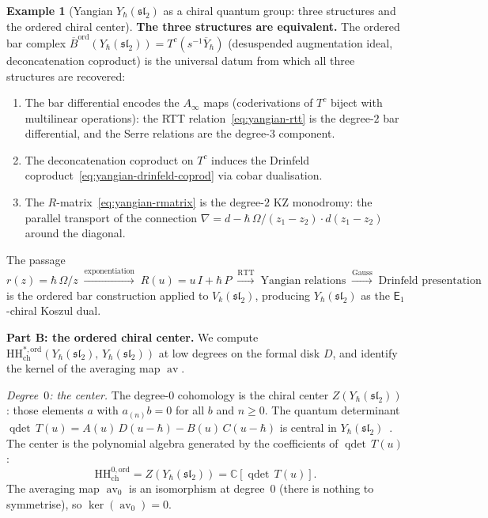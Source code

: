 \documentclass[11pt,reqno]{amsart}
\theoremstyle{definition}
\newtheorem{example}[theorem]{Example}
\theoremstyle{remark}
\newcommand{\HH}{\mathrm{HH}}
\newcommand{\Ainf}{A_{\infty}}
\newcommand{\Eone}{\mathsf{E}_{1}}
\DeclareMathOperator{\av}{av}
\newcommand{\Barord}{\overline{B}^{\mathrm{ord}}}
\newcommand{\CC}{\mathbb{C}}
\numberwithin{equation}{section}
\begin{document}
\begin{example}[Yangian $Y_\hbar(\mathfrak{sl}_2)$
as a chiral quantum group: three structures and the
ordered chiral center]
\medskip
\noindent
\textbf{The three structures are equivalent.}
The ordered bar complex $\Barord(Y_\hbar(\mathfrak{sl}_2))
= T^c(s^{-1}\overline{Y}_\hbar)$ (desuspended augmentation
ideal, deconcatenation coproduct) is the universal datum
from which all three structures are recovered:
\begin{enumerate}[label=\textup{(\alph*)}]
\item The bar differential encodes the $\Ainf$ maps
  (coderivations of $T^c$ biject with multilinear
  operations): the RTT relation~\eqref{eq:yangian-rtt} is
  the degree-$2$ bar differential, and the Serre relations
  are the degree-$3$ component.
\item The deconcatenation coproduct on $T^c$ induces the
  Drinfeld coproduct~\eqref{eq:yangian-drinfeld-coprod}
  via cobar dualisation.
\item The $R$-matrix~\eqref{eq:yangian-rmatrix} is the
  degree-$2$ KZ monodromy: the parallel transport of the
  connection $\nabla = d - \hbar\,\Omega/(z_1 - z_2)
  \cdot d(z_1 - z_2)$ around the diagonal.
\end{enumerate}
The passage
$r(z) = \hbar\,\Omega/z
\;\xrightarrow{\text{exponentiation}}\;
R(u) = u\,I + \hbar\,P
\;\xrightarrow{\text{RTT}}\;
\text{Yangian relations}
\;\xrightarrow{\text{Gauss}}\;
\text{Drinfeld presentation}$
is the ordered bar construction applied to
$V_k(\mathfrak{sl}_2)$, producing
$Y_\hbar(\mathfrak{sl}_2)$ as the $\Eone$-chiral Koszul
dual.

\medskip
\noindent
\textbf{Part B: the ordered chiral center.}
We compute $\HH^{*,\mathrm{ord}}_{\mathrm{ch}}
(Y_\hbar(\mathfrak{sl}_2),\,Y_\hbar(\mathfrak{sl}_2))$
at low degrees on the formal disk $D$, and identify
the kernel of the averaging map $\av$.

\smallskip
\noindent\emph{Degree~$0$: the center.}
The degree-$0$ cohomology is the chiral center
$Z(Y_\hbar(\mathfrak{sl}_2))$: those elements $a$ with
$a_{(n)}b = 0$ for all $b$ and $n \geq 0$.
The quantum determinant
$\operatorname{qdet}\,T(u) = A(u)\,D(u - \hbar)
- B(u)\,C(u - \hbar)$
is central in $Y_\hbar(\mathfrak{sl}_2)$~\cite{Molev07}.
The center is the polynomial algebra generated by the
coefficients of $\operatorname{qdet}\,T(u)$:
\begin{equation}\label{eq:yangian-hh0}
  \HH^{0,\mathrm{ord}}_{\mathrm{ch}}
  = Z(Y_\hbar(\mathfrak{sl}_2))
  = \CC[\operatorname{qdet}\,T(u)].
\end{equation}
The averaging map $\av_0$ is an isomorphism at degree~$0$
(there is nothing to symmetrise), so
$\ker(\av_0) = 0$.


\end{example}
\end{document}
